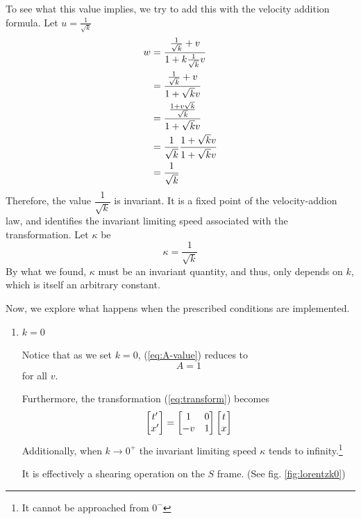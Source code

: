 \begin{solution_pset}
		To see what this value implies, we try to add this with the velocity
		addition formula. Let $u = \frac{1}{\sqrt{k}}$
		\begin{align}
		    w
			&=
				\frac{
					\frac{1}{\sqrt{k}} +v
				}{
					1+k\frac{1}{\sqrt{k}}v
				} \notag
				\\
			&=
				\frac{
					\frac{1}{\sqrt{k}} +v
				}{
					1+{\sqrt{k}}v
				} \notag
				\\
			&=
				\frac{
					\frac{1 + v\sqrt{k}}{\sqrt{k}}
				}{
					1+{\sqrt{k}}v
				} \notag
				\\
			&=
				\frac{1}{\sqrt{k}} 
				\frac{
					1+{\sqrt{k}}v
				}{
					1+{\sqrt{k}}v
				} \notag
				\\
			&= 
				\frac{1}{\sqrt{k}} 
		\end{align}
		Therefore, the value $\dfrac{1}{\sqrt{k}}$ is invariant.
		It is a fixed point of the velocity-addion law,
		and identifies the invariant limiting speed associated
		with the transformation.
		Let $\kappa$ be
		\begin{equation}
			\label{eq:kappa}
		    \kappa = \frac{1}{\sqrt k} 
		\end{equation}
		By what we found, $\kappa$ must be an invariant quantity, and thus,
		only depends on $k$, which is itself an arbitrary constant. 
	
		Now, we explore what happens when the prescribed conditions are 
		implemented.
		\begin{enumerate}[(1)]
		    \item $k = 0$

				Notice that as we set $k=0$, (\ref{eq:A-value})
				reduces to
				\begin{equation}
					\label{eq:A-1}
				    A = 1
				\end{equation}
				for all $v$.

				Furthermore, the transformation (\ref{eq:transform}) becomes
				\begin{equation}
					\label{eq:galilean-transform}
				    \bmqty{
				    	t'\\x'
				    } 
					=
					\bmqty{
						1 & 0 \\
						-v & 1
					} 
					\bmqty{
						t\\x
					} 
				\end{equation}
				Additionally, when $k\to 0^+$ the invariant limiting speed $\kappa$ tends to infinity.\footnote{It cannot be approached from $0^-$}

				It is effectively a shearing operation on the $S$ frame. (See fig. \ref{fig:lorentzk0})


\end{enumerate}
\end{solution_pset}
